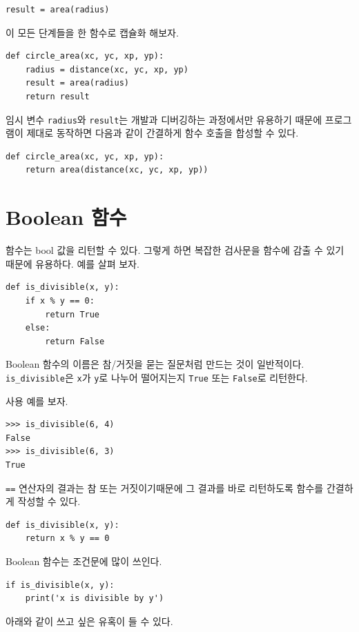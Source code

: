 \documentclass[10pt]{book}
\begin{document}
\begin{verbatim}
result = area(radius)
\end{verbatim}
%
이 모든 단계들을 한 함수로 캡슐화 해보자.

\begin{verbatim}
def circle_area(xc, yc, xp, yp):
    radius = distance(xc, yc, xp, yp)
    result = area(radius)
    return result
\end{verbatim}
%
임시 변수 {\tt radius}와 {\tt result}는 개발과 디버깅하는 과정에서만
유용하기 때문에 프로그램이 제대로 동작하면 다음과 같이 간결하게 함수
호출을 합성할 수 있다.

\begin{verbatim}
def circle_area(xc, yc, xp, yp):
    return area(distance(xc, yc, xp, yp))
\end{verbatim}
%

\section{Boolean 함수}
\label{boolean}

함수는 bool 값을 리턴할 수 있다.  그렇게 하면 복잡한 검사문을 함수에 감출
수 있기 때문에 유용하다.
예를 살펴 보자.

\begin{verbatim}
def is_divisible(x, y):
    if x % y == 0:
        return True
    else:
        return False
\end{verbatim}
%
Boolean 함수의 이름은 참/거짓을 묻는 질문처럼 만드는 것이 일반적이다.
\verb"is_divisible"은 {\tt x}가 {\tt y}로 나누어 떨어지는지 {\tt True}
또는 {\tt False}로 리턴한다.

사용 예를 보자. 

\begin{verbatim}
>>> is_divisible(6, 4)
False
>>> is_divisible(6, 3)
True
\end{verbatim}
%
{\tt ==} 연산자의 결과는 참 또는 거짓이기때문에 그 결과를 바로
리턴하도록 함수를 간결하게 작성할 수 있다.


\begin{verbatim}
def is_divisible(x, y):
    return x % y == 0
\end{verbatim}
%
Boolean 함수는 조건문에 많이 쓰인다. 

\begin{verbatim}
if is_divisible(x, y):
    print('x is divisible by y')
\end{verbatim}
%
아래와 같이 쓰고 싶은 유혹이 들 수 있다. 
\end{document}
